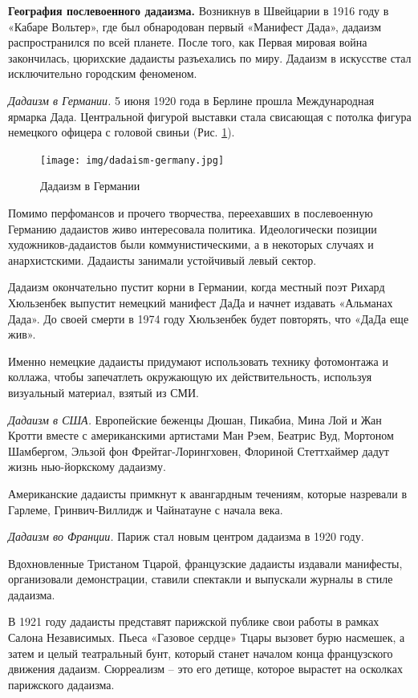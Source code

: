 \textbf{География послевоенного дадаизма.}
Возникнув в Швейцарии в 1916 году в «Кабаре Вольтер», где был обнародован первый «Манифест Дада», дадаизм распространился по всей планете. После того, как Первая мировая война закончилась, цюрихские дадаисты разъехались по миру. Дадаизм в искусстве стал исключительно городским феноменом.


\textit{Дадаизм в Германии.}
5 июня 1920 года в Берлине прошла Международная ярмарка Дада. Центральной фигурой выставки стала свисающая с потолка фигура немецкого офицера с головой свиньи (Рис. \ref{fig:damaism-germany}).

\begin{figure}[h]
    \centering
    \texttt{[image: img/dadaism-germany.jpg]}
    \caption{Дадаизм в Германии}\label{fig:damaism-germany}
\end{figure}

Помимо перфомансов и прочего творчества, переехавших в послевоенную Германию дадаистов живо интересовала политика. Идеологически позиции художников-дадаистов были коммунистическими, а в некоторых случаях и анархистскими. Дадаисты занимали устойчивый левый сектор.

Дадаизм окончательно пустит корни в Германии, когда местный поэт Рихард Хюльзенбек выпустит немецкий манифест ДаДа и начнет издавать «Альманах Дада». До своей смерти в 1974 году Хюльзенбек будет повторять, что «ДаДа еще жив».

Именно немецкие дадаисты придумают использовать технику фотомонтажа и коллажа, чтобы запечатлеть окружающую их действительность, используя визуальный материал, взятый из СМИ.

\textit{Дадаизм в США.}
Европейские беженцы Дюшан, Пикабиа, Мина Лой и Жан Кротти вместе с американскими артистами Ман Рэем, Беатрис Вуд, Мортоном Шамбергом, Эльзой фон Фрейтаг-Лорингховен, Флориной Стеттхаймер дадут жизнь нью-йоркскому дадаизму.

Американские дадаисты примкнут к авангардным течениям, которые назревали в Гарлеме, Гринвич-Виллидж и Чайнатауне с начала века.

\textit{Дадаизм во Франции.}
Париж стал новым центром дадаизма в 1920 году.

Вдохновленные Тристаном Тцарой, французские дадаисты издавали манифесты, организовали демонстрации, ставили спектакли и выпускали журналы в стиле дадаизма.

В 1921 году дадаисты представят парижской публике свои работы в рамках Салона Независимых. Пьеса «Газовое сердце» Тцары вызовет бурю насмешек, а затем и целый театральный бунт, который станет началом конца французского движения дадаизм. Сюрреализм – это его детище, которое вырастет на осколках парижского дадаизма.

